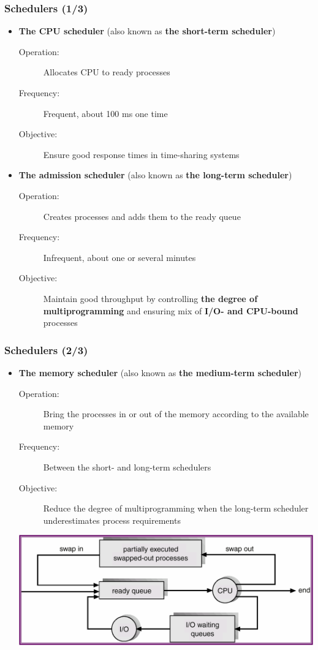 \documentclass[CJKutf8,xcolor=pdftex,dvipsnames,table]{beamer}
\begin{document}
\begin{CJK*}{UTF8}{song}
  \begin{frame}
  \frametitle{Schedulers (1/3)} \pause
  \begin{itemize}
  \item{\textbf{The CPU scheduler} (also known as \textbf{the short-term scheduler})} \pause
    \begin{description}
    \item[Operation:]{Allocates CPU to ready processes} \pause
    \item[Frequency:]{Frequent, about 100 ms one time} \pause
    \item[Objective:]{Ensure good response times in time-sharing systems} \pause
    \end{description}
  \item{\textbf{The admission scheduler} (also known as \textbf{the long-term scheduler})} \pause
    \begin{description}
    \item[Operation:]{Creates processes and adds them to the ready queue} \pause
    \item[Frequency:]{Infrequent, about one or several minutes} \pause
    \item[Objective:]{Maintain good throughput by controlling \textbf{the degree of multiprogramming} and ensuring mix of \textbf{I/O- and CPU-bound} processes}
    \end{description}
  \end{itemize}
  \end{frame}

  \begin{frame}
  \frametitle{Schedulers (2/3)} \pause
  \begin{itemize}
  \item{\textbf{The memory scheduler} (also known as \textbf{the medium-term scheduler})} \pause
    \begin{description}
    \item[Operation:]{Bring the processes in or out of the memory according to the available memory} \pause
    \item[Frequency:]{Between the short- and long-term schedulers} \pause
    \item[Objective:]{Reduce the degree of multiprogramming when the long-term scheduler underestimates process requirements} \pause
    \end{description}
    \begin{center}
      \includegraphics[scale=0.4]{v6f4-6}
    \end{center}
  \end{itemize}


\end{frame}
\end{CJK*}
\end{document}
